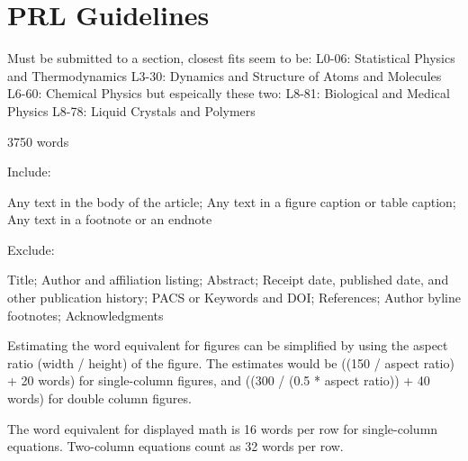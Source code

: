\documentclass[%
 reprint,
superscriptaddress,
showpacs,preprintnumbers,
 amsmath,amssymb,
 aps,
 prl,
]{revtex4-1}
\begin{document}
\section{PRL Guidelines}

Must be submitted to a section, closest fits seem to be:
L0-06: Statistical Physics and Thermodynamics
L3-30: Dynamics and Structure of Atoms and Molecules
L6-60: Chemical Physics
but espeically these two:
L8-81: Biological and Medical Physics
L8-78: Liquid Crystals and Polymers


3750 words

Include:

Any text in the body of the article;
Any text in a figure caption or table caption;
Any text in a footnote or an endnote

Exclude:

Title;
Author and affiliation listing;
Abstract;
Receipt date, published date, and other publication history;
PACS or Keywords and DOI;\@
References;
Author byline footnotes;
Acknowledgments

Estimating the word equivalent for figures can be simplified by using the aspect
ratio (width / height) of the figure. The estimates would be ((150 / aspect
ratio) + 20 words) for single-column figures, and ((300 / (0.5 * aspect ratio))
+ 40 words) for double column figures.

The word equivalent for displayed math is 16 words per row for single-column
equations. Two-column equations count as 32 words per row.



\end{document}
